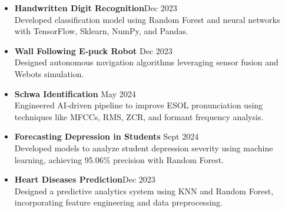 \documentclass[10 pt, letterpaper]{article}
\begin{document}
\begin{itemize}
    \vspace{-0.15cm}
\item \textbf{Handwritten Digit Recognition}\hfill{Dec 2023} \\ Developed classification model using Random Forest and neural networks with TensorFlow, Sklearn, NumPy, and Pandas.
    \vspace{-0.15cm}
        \item \textbf{Wall Following E-puck Robot}\hfill{ Dec 2023} \\Designed autonomous navigation algorithms leveraging sensor fusion and Webots simulation.
    \vspace{-0.15cm}
    \item \textbf{Schwa Identification}\hfill{ May 2024}\\  Engineered AI-driven pipeline to improve ESOL pronunciation using techniques like MFCCs, RMS, ZCR, and formant frequency analysis.
    \vspace{-0.15cm}
    \item \textbf{Forecasting Depression in Students}\hfill{ Sept 2024}\\ Developed models to analyze student depression severity using machine learning, achieving 95.06\% precision with Random Forest.
    \vspace{-0.15cm}
    \item \textbf{Heart Diseases Prediction}\hfill{Dec 2023} \\ Designed a predictive analytics system using KNN and Random Forest, incorporating feature engineering and data preprocessing.
    
\end{itemize}


\vspace{-0.1cm}
\end{document}
